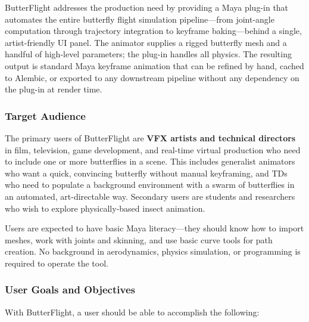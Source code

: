 \documentclass[12pt]{article}
\begin{document}
ButterFlight addresses the production need by providing a Maya plug-in that
automates the entire butterfly flight simulation pipeline---from joint-angle
computation through trajectory integration to keyframe baking---behind a
single, artist-friendly UI panel. The animator supplies a rigged butterfly
mesh and a handful of high-level parameters; the plug-in handles all
physics. The resulting output is standard Maya keyframe animation that can be
refined by hand, cached to Alembic, or exported to any downstream pipeline
without any dependency on the plug-in at render time.

\subsubsection{Target Audience}

The primary users of ButterFlight are \textbf{VFX artists and technical directors}
in film, television, game development, and real-time virtual production who need
to include one or more butterflies in a scene. This includes generalist
animators who want a quick, convincing butterfly without manual keyframing, and
TDs who need to populate a background environment with a swarm of butterflies in
an automated, art-directable way. Secondary users are students and researchers
who wish to explore physically-based insect animation.

Users are expected to have basic Maya literacy---they should know how to import
meshes, work with joints and skinning, and use basic curve tools for path
creation. No background in aerodynamics, physics simulation, or programming is
required to operate the tool.

\subsubsection{User Goals and Objectives}

With ButterFlight, a user should be able to accomplish the following:
\end{document}
